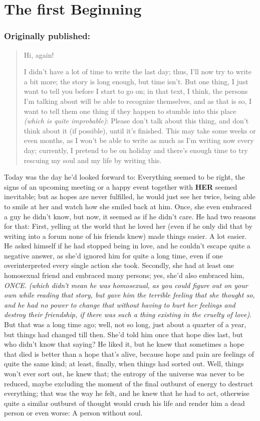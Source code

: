 \chapter{The first Beginning}
\label{cha:the-first-beginning}
\subsection*{Originally published: }
\begin{verse}
Hi, again!

I didn't have a lot of time to write the last day; thus, I'll now try to write a bit more; the story is long enough, but time isn't. 
But one thing, I just want to tell you before I start to go on; in that text, I think, the persons I'm talking about will be able to recognize themselves, and as that is so, I want to tell them one thing if they happen to stumble into this place \emph{(which is quite improbable)}: Please don't talk about this thing, and don't think about it (if possible), until it's finished. This may take some weeks or even months, as I won't be able to write as much as I'm writing now every day; currently, I pretend to be on holiday and there's enough time to try rescuing my soul and my life by writing this. 
\end{verse}

Today was the day he'd looked forward to: Everything seemed to be right, the signs of an upcoming meeting or a happy event together with \textbf{HER} seemed inevitable; but as hopes are never fulfilled, he would just see her twice, being able to smile at her and watch how she smiled back at him. Once, she even embraced a guy he didn't know, but now, it seemed as if he didn't care. He had two reasons for that: First, yelling at the world that he loved her (even if he only did that by writing into a forum none of his friends knew) made things easier. A lot easier. He asked himself if he had stopped being in love, and he couldn't escape quite a negative answer, as she'd ignored him for quite a long time, even if one overinterpreted every single action she took. Secondly, she had at least one homosexual friend and embraced many persons; yes, she'd also embraced him, \emph{ONCE.} \emph{(which didn't mean he was homosexual, as you could figure out on your own while reading that story, but gave him the terrible feeling that she thought so, and he had no power to change that without having to hurt her feelings and destroy their friendship, if there was such a thing existing in the cruelty of love)}. But that was a long time ago; well, not so long, just about a quarter of a year, but things had changed till then. She'd told him once that hope dies last, but who didn't know that saying? He liked it, but he knew that sometimes a hope that died is better than a hope that's alive, because hope and pain are feelings of quite the same kind; at least, finally, when things had sorted out. Well, things won't ever sort out, he knew that; the entropy of the universe was never to be reduced, maybe excluding the moment of the final outburst of energy to destruct everything; that was the way he felt, and he knew that he had to act, otherwise quite a similar outburst of thought would crush his life and render him a dead person or even worse: A person without soul.

